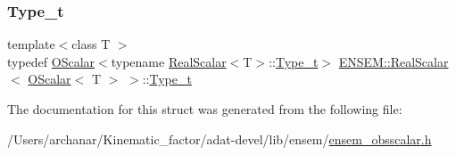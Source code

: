 \subsubsection{\texorpdfstring{Type\_t}{Type\_t}\hspace{0.1cm}{\footnotesize\ttfamily [3/3]}}
{\footnotesize\ttfamily template$<$class T $>$ \\
typedef \mbox{\hyperlink{classENSEM_1_1OScalar}{O\+Scalar}}$<$typename \mbox{\hyperlink{structENSEM_1_1RealScalar}{Real\+Scalar}}$<$T$>$\+::\mbox{\hyperlink{structENSEM_1_1RealScalar_3_01OScalar_3_01T_01_4_01_4_a6c39297bc962beb39d2b33a9cdf329dd}{Type\+\_\+t}}$>$ \mbox{\hyperlink{structENSEM_1_1RealScalar}{E\+N\+S\+E\+M\+::\+Real\+Scalar}}$<$ \mbox{\hyperlink{classENSEM_1_1OScalar}{O\+Scalar}}$<$ T $>$ $>$\+::\mbox{\hyperlink{structENSEM_1_1RealScalar_3_01OScalar_3_01T_01_4_01_4_a6c39297bc962beb39d2b33a9cdf329dd}{Type\+\_\+t}}}



The documentation for this struct was generated from the following file\+:\begin{DoxyCompactItemize}
\item 
/\+Users/archanar/\+Kinematic\+\_\+factor/adat-\/devel/lib/ensem/\mbox{\hyperlink{adat-devel_2lib_2ensem_2ensem__obsscalar_8h}{ensem\+\_\+obsscalar.\+h}}\end{DoxyCompactItemize}
